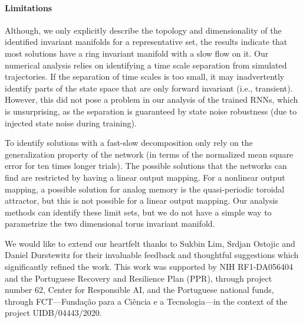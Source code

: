 \documentclass{article} %
\newcounter{ct}
\theoremstyle{definition}
\theoremstyle{remark}
\begin{document}
\paragraph{Limitations}
Although, we only explicitly describe the topology and dimensionality of the identified invariant manifolds for a representative set, the results indicate that most solutions have a ring invariant manifold with a slow flow on it.
Our numerical analysis relies on identifying a time scale separation from simulated trajectories. If the separation of time scales is too small, it may inadvertently identify parts of the state space that are only forward invariant (i.e., transient). However, this did not pose a problem in our analysis of the trained RNNs, which is unsurprising, as the separation is guaranteed by state noise robustness (due to injected state noise during training).

To identify solutions with a fast-slow decomposition only rely on the generalization property of the network (in terms of the normalized mean square error for ten times longer trials).
The possible solutions that the networks can find are restricted by having a linear output mapping.
For a nonlinear output mapping, a possible solution for analog memory is the quasi-periodic toroidal attractor, but this is not possible for a linear output mapping.
Our analysis methods can identify these limit sets, but we do not have a simple way to parametrize the two dimensional torus invariant manifold.

\begin{ack}
We would like to extend our heartfelt thanks to Sukbin Lim, Srdjan Ostojic and Daniel Durstewitz for their invaluable feedback and thoughtful suggestions which significantly refined the work.
This work was supported by NIH RF1-DA056404 and the Portuguese Recovery and Resilience Plan (PPR), through project number 62, Center for Responsible AI, and the Portuguese national funds, through FCT---Funda\c{c}\~{a}o para a Ci\^{e}ncia e a Tecnologia---in the context of the project UIDB/04443/2020.
\end{ack}


\end{document}
